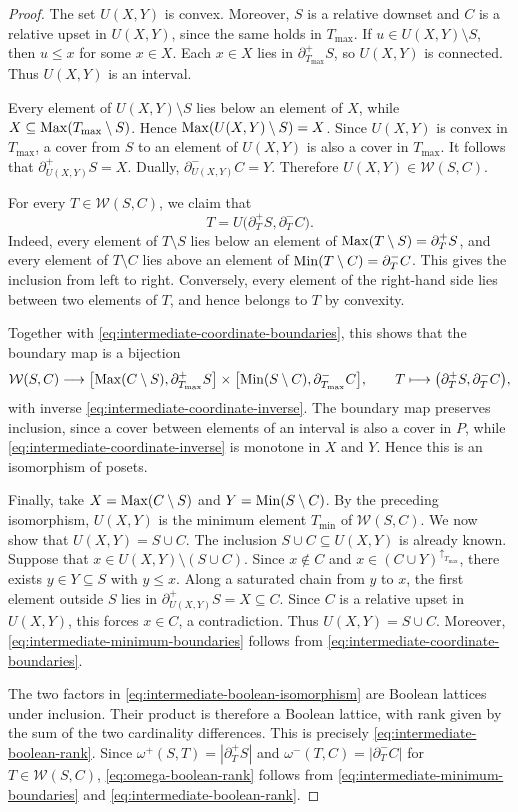 \begin{proof}
The set $U(X,Y)$ is convex.  Moreover, $S$ is a relative downset and
$C$ is a relative upset in $U(X,Y)$, since the same holds in
$T_{\max}$.  If $u\in U(X,Y)\setminus S$, then
$u\leq x$ for some $x\in X$.  Each $x\in X$ lies in
$\partial_{T_{\max}}^+S$, so $U(X,Y)$ is connected.  Thus
$U(X,Y)$ is an interval.

Every element of $U(X,Y)\setminus S$ lies below an element of $X$,
while
$X\subseteq\operatorname{Max}(T_{\max}\setminus S)$.  Hence
$\operatorname{Max}(U(X,Y)\setminus S)=X$.  Since $U(X,Y)$ is convex in
$T_{\max}$, a cover from $S$ to an element of $U(X,Y)$ is also a
cover in $T_{\max}$.  It follows that
$\partial_{U(X,Y)}^+S=X$.  Dually,
$\partial_{U(X,Y)}^-C=Y$.  Therefore
$U(X,Y)\in\mathcal W(S,C)$.

For every $T\in\mathcal W(S,C)$, we claim that
\[
T
=
U\bigl(
\partial_T^+S,
\partial_T^-C
\bigr).
\]
Indeed, every element of $T\setminus S$ lies below an element of
$\operatorname{Max}(T\setminus S)=\partial_T^+S$, and every element of
$T\setminus C$ lies above an element of
$\operatorname{Min}(T\setminus C)=\partial_T^-C$.
This gives the inclusion from left to right.
Conversely, every element of the right-hand side lies between two
elements of $T$, and hence belongs to $T$ by convexity.

Together with \eqref{eq:intermediate-coordinate-boundaries}, this shows
that the boundary map is a bijection
\[
\mathcal W(S,C)
\longrightarrow
\bigl[
\operatorname{Max}(C\setminus S),
\partial_{T_{\max}}^+S
\bigr]
\times
\bigl[
\operatorname{Min}(S\setminus C),
\partial_{T_{\max}}^-C
\bigr],
\qquad
T
\longmapsto
\bigl(
\partial_T^+S,
\partial_T^-C
\bigr),
\]
with inverse \eqref{eq:intermediate-coordinate-inverse}.
The boundary map preserves inclusion, since a cover between elements
of an interval is also a cover in $P$, while
\eqref{eq:intermediate-coordinate-inverse} is monotone in $X$ and
$Y$.  Hence this is an isomorphism of posets.

Finally, take
$X=\operatorname{Max}(C\setminus S)$ and 
$Y=\operatorname{Min}(S\setminus C)$.
By the preceding isomorphism, $U(X,Y)$ is the minimum element $T_{\min}$ of
$\mathcal W(S,C)$.  We now show that
$U(X,Y)=S\cup C$.
The inclusion $S\cup C\subseteq U(X,Y)$ is already known.
Suppose that
$x\in U(X,Y)\setminus(S\cup C)$.
Since $x\notin C$ and
$x\in(C\cup Y)^{\uparrow_{T_{\max}}}$, there exists
$y\in Y\subseteq S$ with $y\leq x$.
Along a saturated chain from $y$ to $x$, the first element outside
$S$ lies in
$\partial_{U(X,Y)}^+S=X\subseteq C$.
Since $C$ is a relative upset in $U(X,Y)$, this forces $x\in C$, a
contradiction.
Thus $U(X,Y)=S\cup C$.
Moreover,
\eqref{eq:intermediate-minimum-boundaries} follows from
\eqref{eq:intermediate-coordinate-boundaries}.


The two factors in
\eqref{eq:intermediate-boolean-isomorphism} are Boolean lattices
under inclusion. Their product is therefore a Boolean lattice, with
rank given by the sum of the two cardinality differences.
This is precisely
\eqref{eq:intermediate-boolean-rank}.
Since
$\omega^+(S,T)=|\partial_T^+S|$ and
$\omega^-(T,C)=|\partial_T^-C|$ for $T\in\mathcal W(S,C)$,
\eqref{eq:omega-boolean-rank} follows from
\eqref{eq:intermediate-minimum-boundaries} and
\eqref{eq:intermediate-boolean-rank}.
\end{proof}

